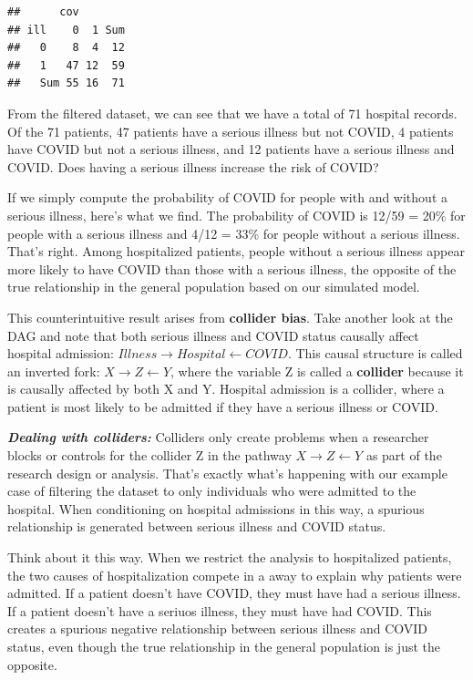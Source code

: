 \documentclass[
]{book}
\begin{document}
\begin{verbatim}
##      cov
## ill    0  1 Sum
##   0    8  4  12
##   1   47 12  59
##   Sum 55 16  71
\end{verbatim}

From the filtered dataset, we can see that we have a total of 71 hospital records. Of the 71 patients, 47 patients have a serious illness but not COVID, 4 patients have COVID but not a serious illness, and 12 patients have a serious illness and COVID. Does having a serious illness increase the risk of COVID?

If we simply compute the probability of COVID for people with and without a serious illness, here's what we find. The probability of COVID is 12/59 = 20\% for people with a serious illness and 4/12 = 33\% for people without a serious illness. That's right. Among hospitalized patients, people without a serious illness appear more likely to have COVID than those with a serious illness, the opposite of the true relationship in the general population based on our simulated model.

This counterintuitive result arises from \textbf{collider bias}. Take another look at the DAG and note that both serious illness and COVID status causally affect hospital admission: \(Illness \to Hospital \gets COVID\). This causal structure is called an inverted fork: \(X \to Z \gets Y\), where the variable Z is called a \textbf{collider} because it is causally affected by both X and Y. Hospital admission is a collider, where a patient is most likely to be admitted if they have a serious illness or COVID.

\textbf{\emph{Dealing with colliders:}} Colliders only create problems when a researcher blocks or controls for the collider Z in the pathway \(X \to Z \gets Y\) as part of the research design or analysis. That's exactly what's happening with our example case of filtering the dataset to only individuals who were admitted to the hospital. When conditioning on hospital admissions in this way, a spurious relationship is generated between serious illness and COVID status.

Think about it this way. When we restrict the analysis to hospitalized patients, the two causes of hospitalization compete in a away to explain why patients were admitted. If a patient doesn't have COVID, they must have had a serious illness. If a patient doesn't have a seriuos illness, they must have had COVID. This creates a spurious negative relationship between serious illness and COVID status, even though the true relationship in the general population is just the opposite.
\end{document}
